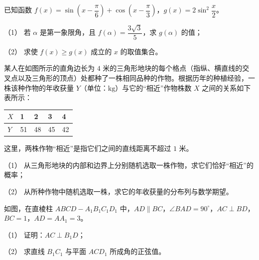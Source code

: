 \begin{question}
已知函数 $f(x)=\sin\left(x-\dfrac{\pi}{6}\right)+\cos\left(x-\dfrac{\pi}{3}\right)$，$g(x)=2\sin^2\dfrac x2$。

（1） 若 $\alpha$ 是第一象限角，且 $f(\alpha)=\dfrac{3\sqrt3}{5}$，求 $g(\alpha)$ 的值；

（2） 求使 $f(x)\geqslant g(x)$ 成立的 $x$ 的取值集合。

\Needspace{0.4\textheight}
\end{question}
\begin{question}
某人在如图所示的直角边长为 $4$ 米的三角形地块的每个格点（指纵、横直线的交叉点以及三角形的顶点）处都种了一株相同品种的作物。根据历年的种植经验，一株该种作物的年收获量 $Y$（单位：$\mathrm{kg}$）与它的“相近”作物株数 $X$ 之间的关系如下表所示：

\begin{center}
\begin{tabular}{lllll}
\toprule
$X$ & 1 & 2 & 3 & 4 \\
\midrule
$Y$ & 51 & 48 & 45 & 42 \\
\bottomrule
\end{tabular}
\end{center}

这里，两株作物“相近”是指它们之间的直线距离不超过 $1$ 米。

（1） 从三角形地块的内部和边界上分别随机选取一株作物，求它们恰好“相近”的概率；

（2） 从所种作物中随机选取一株，求它的年收获量的分布列与数学期望。
\nopagebreak[4]
\begin{center}\end{center}
\nopagebreak[4]
\Needspace{0.4\textheight}
\end{question}
\begin{question}
如图，在直棱柱 $ABCD-A_1B_1C_1D_1$ 中，$AD\parallel BC$，$\angle BAD=90^\circ$，$AC\perp BD$，$BC=1$，$AD=AA_1=3$。

（1） 证明：$AC\perp B_1D$；

（2） 求直线 $B_1C_1$ 与平面 $ACD_1$ 所成角的正弦值。
\nopagebreak[4]
\begin{center}\end{center}
\nopagebreak[4]
\Needspace{0.4\textheight}
\end{question}
